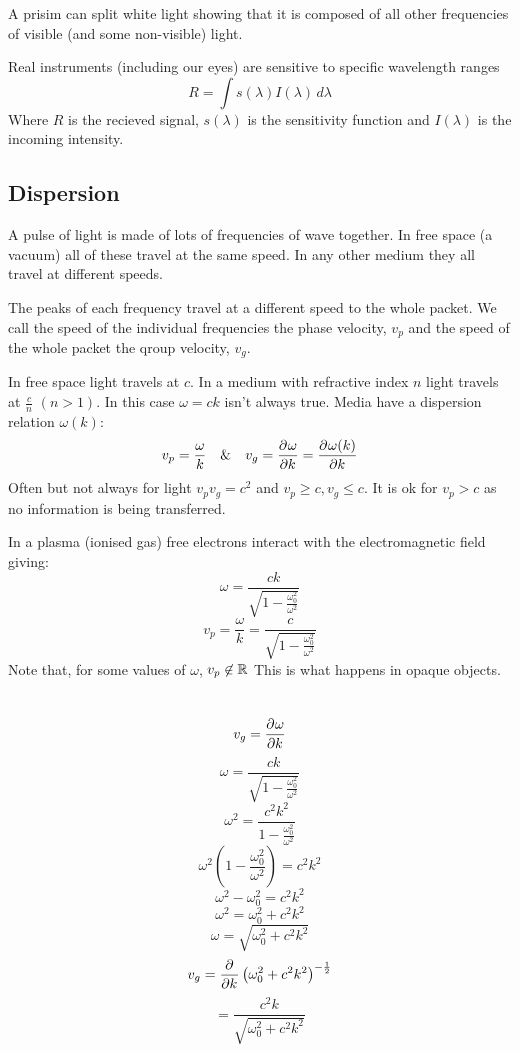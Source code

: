 A prisim can split white light showing that it is composed of all other frequencies of visible (and some non-visible) light.

Real instruments (including our eyes) are sensitive to specific wavelength ranges
\[R=\int s(\lambda)I(\lambda)\,d\lambda\]
Where \(R\) is the recieved signal, \(s(\lambda)\) is the sensitivity function and \(I(\lambda)\) is the incoming intensity.

\subsection*{Dispersion}

A pulse of light is made of lots of frequencies of wave together. In free space (a vacuum) all of these travel at the same speed. In any other medium they all travel at different speeds.

The peaks of each frequency travel at a different speed to the whole packet. We call the speed of the individual frequencies the phase velocity, \(v_p\) and the speed of the whole packet the qroup velocity, \(v_g\).

In free space light travels at \(c\). In a medium with refractive index \(n\) light travels at \(\frac cn\) \((n>1)\). In this case \(\omega=ck\) isn't always true. Media have a dispersion relation \(\omega(k)\):
\[v_p=\frac{\omega}{k}\quad\&\quad v_g=\frac{\partial^{}{\omega}}{\partial{k}^{}}=\frac{\partial^{}{\omega(k)}}{\partial{k}^{}}\]
Often but not always for light \(v_pv_g=c^2\) and \(v_p\ge c,v_g\le c\). It is ok for \(v_p>c\) as no information is being transferred.

In a plasma (ionised gas) free electrons interact with the electromagnetic field giving:
\[\omega=\frac{ck}{\sqrt{1-\frac{\omega_0^2}{\omega^2}}}\]
\[v_p=\frac{\omega}{k}=\frac{c}{\sqrt{1-\frac{\omega_0^2}{\omega^2}}}\]
Note that, for some values of \(\omega\), \(v_p\not\in\mathbb{R}\) This is what happens in opaque objects.

\section{}

\[v_g=\frac{\partial^{}{\omega}}{\partial{k}^{}}\]
\[\omega=\frac{ck}{\sqrt{1-\frac{\omega_0^2}{\omega^2}}}\]
\[\omega^2=\frac{c^2k^2}{1-\frac{\omega_0^2}{\omega^2}}\]
\[\omega^2\left(1-\frac{\omega_0^2}{\omega^2}\right)=c^2k^2\]
\[\omega^2-\omega_0^2=c^2k^2\]
\[\omega^2=\omega_0^2+c^2k^2\]
\[\omega=\sqrt{\omega_0^2+c^2k^2}\]
\[v_g=\frac{\partial^{}}{\partial{k}^{}}\left(\omega_0^2+c^2k^2\right)^{-\frac{1}{2}}\]
\[=\frac{c^2k}{\sqrt{\omega_0^2+c^2k^2}}\]

